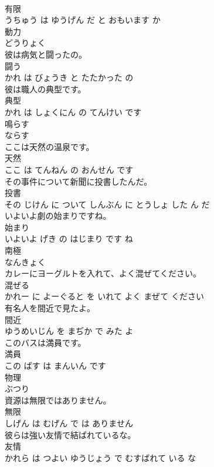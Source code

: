 \documentclass[8pt]{extreport}
\begin{document}
\begin{CJK}{UTF8}{min}
\\	有限 
\\	うちゅう は ゆうげん だ と おもいます か			
\\	動力	
\\	どうりょく		
\\	彼は病気と闘ったの。	
\\	闘う 
\\	かれ は びょうき と たたかった の			
\\	彼は職人の典型です。	
\\	典型 
\\	かれ は しょくにん の てんけい です			
\\	鳴らす	
\\	ならす		
\\	ここは天然の温泉です。	
\\	天然 
\\	ここ は てんねん の おんせん です			
\\	その事件について新聞に投書したんだ。	
\\	投書 
\\	その じけん に ついて しんぶん に とうしょ した ん だ			
\\	いよいよ劇の始まりですね。	
\\	始まり 
\\	いよいよ げき の はじまり です ね			
\\	南極	
\\	なんきょく		
\\	カレーにヨーグルトを入れて、よく混ぜてください。	
\\	混ぜる 
\\	かれー に よーぐると を いれて よく まぜて ください			
\\	有名人を間近で見たよ。	
\\	間近 
\\	ゆうめいじん を まぢか で みた よ			
\\	このバスは満員です。	
\\	満員 
\\	この ばす は まんいん です			
\\	物理	
\\	ぶつり		
\\	資源は無限ではありません。	
\\	無限 
\\	しげん は むげん で は ありません			
\\	彼らは強い友情で結ばれているな。	
\\	友情 
\\	かれら は つよい ゆうじょう で むすばれて いる な			

\end{CJK}
\end{document}
